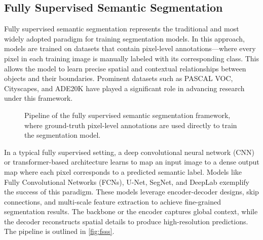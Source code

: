 \subsection{Fully Supervised Semantic Segmentation}
\label{subsec:fully_supervised}
Fully supervised semantic segmentation represents the traditional and most widely adopted paradigm for training segmentation models. In this approach, models are trained on datasets that contain pixel-level annotations—where every pixel in each training image is manually labeled with its corresponding class. This allows the model to learn precise spatial and contextual relationships between objects and their boundaries. Prominent datasets such as PASCAL VOC, Cityscapes, and ADE20K have played a significant role in advancing research under this framework.

\begin{figure}[htbp]
    \centering
    \caption{Pipeline of the fully supervised semantic segmentation framework, where ground-truth pixel-level annotations are used directly to train the segmentation model.}
    \label{fig:fsss}
\end{figure}

In a typical fully supervised setting, a deep convolutional neural network (CNN) or transformer-based architecture learns to map an input image to a dense output map where each pixel corresponds to a predicted semantic label. Models like Fully Convolutional Networks (FCNs), U-Net, SegNet, and DeepLab exemplify the success of this paradigm. These models leverage encoder-decoder designs, skip connections, and multi-scale feature extraction to achieve fine-grained segmentation results. The backbone or the encoder captures global context, while the decoder reconstructs spatial details to produce high-resolution predictions. The pipeline is outlined in \autoref{fig:fsss}.

